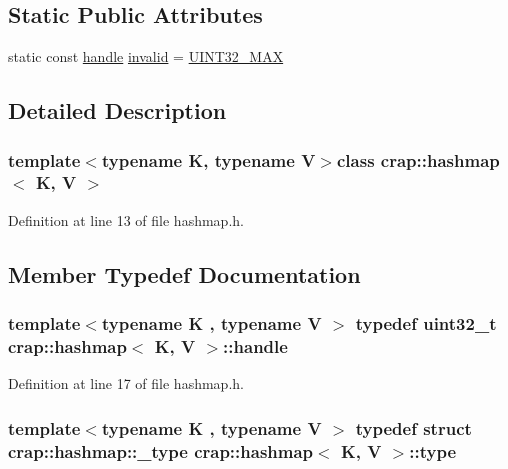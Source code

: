 \subsection*{Static Public Attributes}
\begin{DoxyCompactItemize}
\item 
static const \hyperlink{classcrap_1_1hashmap_a290dd70891131cbc14ed79c1c5aa37e5}{handle} \hyperlink{classcrap_1_1hashmap_af1db8f222fca6a0d29c2873f2fd10c5f}{invalid} = \hyperlink{crap__types_8h_ab5eb23180f7cc12b7d6c04a8ec067fdd}{U\+I\+N\+T32\+\_\+\+M\+A\+X}
\end{DoxyCompactItemize}


\subsection{Detailed Description}
\subsubsection*{template$<$typename K, typename V$>$class crap\+::hashmap$<$ K, V $>$}



Definition at line 13 of file hashmap.\+h.



\subsection{Member Typedef Documentation}
\hypertarget{classcrap_1_1hashmap_a290dd70891131cbc14ed79c1c5aa37e5}{
\subsubsection[{handle}]{\setlength{\rightskip}{0pt plus 5cm}template$<$typename K , typename V $>$ typedef uint32\+\_\+t {\bf crap\+::hashmap}$<$ K, V $>$\+::{\bf handle}}}\label{classcrap_1_1hashmap_a290dd70891131cbc14ed79c1c5aa37e5}


Definition at line 17 of file hashmap.\+h.

\hypertarget{classcrap_1_1hashmap_a017f9bcee5d676125b3a765f33fc6e11}{
\subsubsection[{type}]{\setlength{\rightskip}{0pt plus 5cm}template$<$typename K , typename V $>$ typedef struct {\bf crap\+::hashmap\+::\+\_\+type}
     {\bf crap\+::hashmap}$<$ K, V $>$\+::{\bf type}}}\label{classcrap_1_1hashmap_a017f9bcee5d676125b3a765f33fc6e11}


